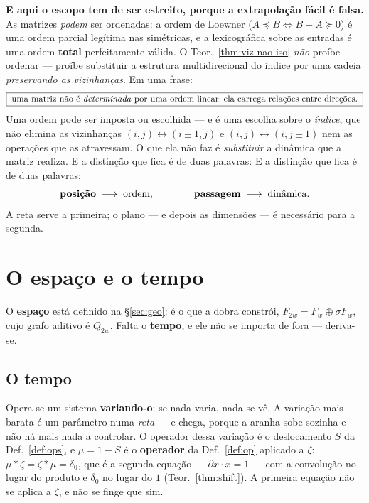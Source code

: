 \documentclass[11pt,a4paper]{article}
\begin{document}
\medskip\noindent\textbf{E aqui o escopo tem de ser estreito, porque a
extrapolação fácil é falsa.} As matrizes \emph{podem} ser ordenadas: a ordem de
Loewner ($A\preceq B\iff B-A\succeq0$) é uma ordem parcial legítima nas simétricas,
e a lexicográfica sobre as entradas é uma ordem \textbf{total} perfeitamente
válida. O Teor.~\ref{thm:viz-nao-iso} \emph{não} proíbe ordenar --- proíbe
substituir a estrutura multidirecional do índice por uma cadeia \emph{preservando
as vizinhanças}. Em uma frase:
\[
\boxed{\;\text{uma matriz não é \emph{determinada} por uma ordem linear:}\;
\text{ela carrega relações entre direções.}\;}
\]
Uma ordem pode ser imposta ou escolhida --- e é uma escolha sobre o \emph{índice},
que não elimina as vizinhanças $(i,j)\leftrightarrow(i\pm1,j)$ e
$(i,j)\leftrightarrow(i,j\pm1)$ nem as operações que as atravessam. O que ela não
faz é \emph{substituir} a dinâmica que a matriz realiza. E a distinção que fica é
de duas palavras: E a distinção que fica é de duas palavras:
\[
\text{\textbf{posição}}\;\longrightarrow\;\text{ordem},
\qquad\qquad
\text{\textbf{passagem}}\;\longrightarrow\;\text{dinâmica}.
\]
A reta serve a primeira; o plano --- e depois as dimensões --- é necessário para a
segunda.

\section{O espaço e o tempo}\label{sec:leitura}

\noindent O \textbf{espaço} está definido na §\ref{sec:geo}: é o que a dobra
constrói, $F_{2w}=F_w\oplus\sigma F_w$, cujo grafo aditivo é $Q_{2w}$. Falta o
\textbf{tempo}, e ele não se importa de fora --- deriva-se.

\subsection*{O tempo}

\noindent Opera-se um sistema \textbf{variando-o}: se nada varia, nada se vê. A
variação mais barata é um parâmetro numa \emph{reta} --- e chega, porque a
aranha sobe sozinha e não há mais nada a controlar. O operador dessa variação é
o deslocamento $S$ da Def.~\ref{def:ops}, e $\mu=1-S$ é o \textbf{operador} da
Def.~\ref{def:op} aplicado a $\zeta$: $\mu*\zeta=\zeta*\mu=\delta_0$, que é a
segunda equação --- $\partial x\cdot x=1$ --- com a convolução no lugar do
produto e $\delta_0$ no lugar do $1$ (Teor.~\ref{thm:shift}). A primeira equação
não se aplica a $\zeta$, e não se finge que sim.
\end{document}

